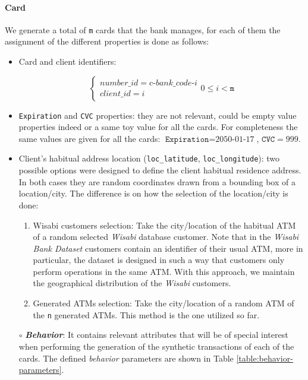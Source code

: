 \documentclass{article}
\begin{document}
\paragraph*{Card}

We generate a total of \texttt{m} cards that the bank manages, for each of them the assignment of the different properties is done as follows:

\begin{itemize}
\item Card and client identifiers:

\[
\begin{cases} 
number\_id = \text{c-}bank\_code\text{-}i \\
client\_id = i 
\end{cases}
0 \leq i < \texttt{m}
\]

\item \texttt{Expiration} and \texttt{CVC} properties: they are not relevant, could be empty 
  value properties indeed or a same toy value for all the cards. For completeness the  
  same values are given for all the cards: $\texttt{Expiration} = \text{2050-01-17}$, $\texttt{CVC} = 999$.

\item Client's habitual address location (\texttt{loc\_latitude}, \texttt{loc\_longitude}): two possible options were designed to define the client habitual residence address. In both 
cases they are random 
coordinates drawn from a bounding box of a location/city. The difference is on how the selection of the location/city is done:

  \begin{enumerate}
      \item Wisabi customers selection: Take the city/location of the habitual ATM of a random selected \emph{Wisabi} database customer. Note that in the \emph{Wisabi Bank Dataset} customers contain an identifier
      of their usual ATM, more in particular, the dataset is designed in such a way that customers
      only perform operations in the same ATM.
      With this approach, we maintain the geographical distribution of the \emph{Wisabi} customers.
      \item Generated ATMs selection: Take the city/location of a random ATM of the \texttt{n} generated ATMs. This method is the one utilized so far.
  \end{enumerate}

\item[$\circ$]\textbf{\emph{Behavior}}: It contains relevant attributes that will be of special interest when performing the 
generation of the synthetic transactions of each of the cards. The defined \emph{behavior}
parameters are shown in Table \ref{table:behavior-parameters}. 


\end{itemize}
\end{document}
